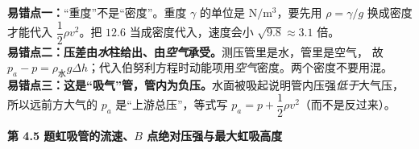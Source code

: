 \begin{yicuo}
\textbf{易错点一：}“重度”不是“密度”。重度 $\gamma$ 的单位是 $\mathrm{N/m^3}$，要先用 $\rho=\gamma/g$ 换成密度才能代入
$\dfrac{1}{2}\rho v^2$。把 $12.6$ 当成密度代入，速度会小 $\sqrt{9.8}\approx3.1$ 倍。\\
\textbf{易错点二：压差由\emph{水}柱给出、由\emph{空气}承受。}测压管里是水，管里是空气，
故 $p_a-p=\rho_{\text{水}}g\Delta h$；代入伯努利方程时动能项用\emph{空气}密度。两个密度不要用混。\\
\textbf{易错点三：这是“吸气”管，管内为负压。}水面被吸起说明管内压强\emph{低于}大气压，
所以远前方大气的 $p_a$ 是“上游总压”，等式写 $p_a=p+\dfrac{1}{2}\rho v^2$（而不是反过来）。
\end{yicuo}

\noindent\textbf{第 4.5 题\quad 虹吸管的流速、$B$ 点绝对压强与最大虹吸高度}


